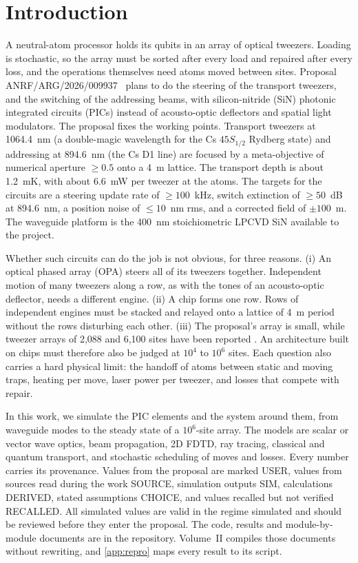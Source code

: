 \section{Introduction}\label{sec:intro}

A neutral-atom processor holds its qubits in an array of optical tweezers. Loading is stochastic, so the array
must be sorted after every load and repaired after every loss, and the operations themselves need atoms moved
between sites. Proposal ANRF/ARG/2026/009937~\cite{proposal} plans to do the steering of the transport
tweezers, and the switching of the addressing beams, with silicon-nitride (SiN) photonic integrated circuits
(PICs) instead of acousto-optic deflectors and spatial light modulators. The proposal fixes the working
points. Transport tweezers at 1064.4~nm (a double-magic wavelength for the Cs $45S_{1/2}$ Rydberg state) and
addressing at 894.6~nm (the Cs D1 line) are focused by a meta-objective of numerical aperture $\geq 0.5$ onto a
4~\textmu m lattice. The transport depth is about 1.2~mK, with about 6.6~mW per tweezer at the atoms. The
targets for the circuits are a steering update rate of $\geq 100$~kHz, switch extinction of $\geq 50$~dB at
894.6~nm, a position noise of $\leq 10$~nm rms, and a corrected field of $\pm 100$~\textmu m. The waveguide
platform is the 400~nm stoichiometric LPCVD SiN available to the project.

Whether such circuits can do the job is not obvious, for three reasons. (i) An optical phased array (OPA) steers
all of its tweezers together. Independent motion of many tweezers along a row, as with the tones of an
acousto-optic deflector, needs a different engine. (ii) A chip forms one row. Rows of independent engines must be
stacked and relayed onto a lattice of 4~\textmu m period without the rows disturbing each other. (iii) The
proposal's array is small, while tweezer arrays of 2,088 and 6,100 sites have been reported
\cite{pichard2024,manetsch2024}. An architecture built on chips must therefore also be judged at $10^4$ to
$10^6$ sites. Each question also carries a hard physical limit: the
handoff of atoms between static and moving traps, heating per move, laser power per tweezer, and losses that
compete with repair.

In this work, we simulate the PIC elements and the system around them, from waveguide modes to the steady
state of a $10^6$-site array. The models are scalar or vector wave optics, beam propagation, 2D FDTD, ray
tracing, classical and quantum transport, and stochastic scheduling of moves and losses. Every number carries
its provenance. Values from the proposal are marked USER, values from sources read during the work SOURCE,
simulation outputs SIM, calculations DERIVED, stated assumptions CHOICE, and values recalled but not verified
RECALLED. All simulated values are valid in the regime simulated and should be reviewed before they enter the
proposal. The code, results and module-by-module documents are in the repository. Volume~II compiles those
documents without rewriting, and \cref{app:repro} maps every result to its script.

